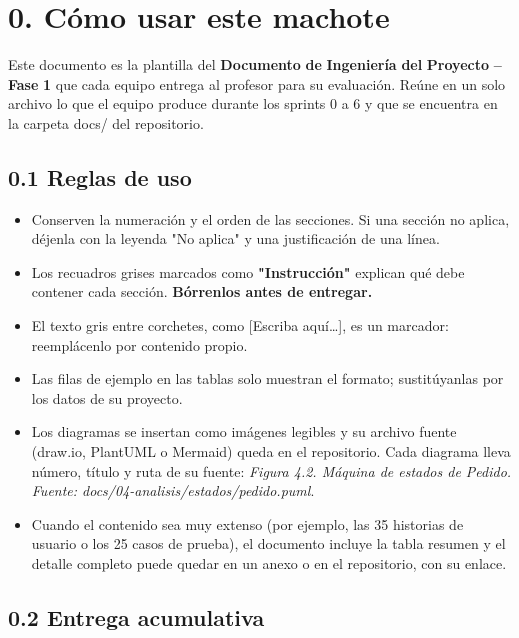 \section{0. Cómo usar este machote}\label{cuxf3mo-usar-este-machote}

Este documento es la plantilla del \textbf{Documento} \textbf{de}
\textbf{Ingeniería} \textbf{del} \textbf{Proyecto} \textbf{--}
\textbf{Fase} \textbf{1} que cada equipo entrega al profesor para su
evaluación. Reúne en un solo archivo lo que el equipo produce durante
los sprints 0 a 6 y que se encuentra en la carpeta docs/ del
repositorio.

\subsection{0.1 Reglas de uso}\label{reglas-de-uso}

\begin{itemize}
\item
  Conserven la numeración y el orden de las secciones. Si una sección no
  aplica, déjenla con la leyenda "No aplica" y una justificación de una
  línea.
\item
  Los recuadros grises marcados como \textbf{"Instrucción"} explican qué
  debe contener cada sección. \textbf{Bórrenlos antes de entregar.}
\item
  El texto gris entre corchetes, como {[}Escriba aquí\ldots{]}, es un
  marcador: reemplácenlo por contenido propio.
\item
  Las filas de ejemplo en las tablas solo muestran el formato;
  sustitúyanlas por los datos de su proyecto.
\item
  Los diagramas se insertan como imágenes legibles y su archivo fuente
  (draw.io, PlantUML o Mermaid) queda en el repositorio. Cada diagrama
  lleva número, título y ruta de su fuente: \emph{Figura 4.2. Máquina de
  estados de Pedido. Fuente: docs/04-analisis/estados/pedido.puml}.
\item
  Cuando el contenido sea muy extenso (por ejemplo, las 35 historias de
  usuario o los 25 casos de prueba), el documento incluye la tabla
  resumen y el detalle completo puede quedar en un anexo o en el
  repositorio, con su enlace.
\end{itemize}

\subsection{0.2 Entrega acumulativa}\label{entrega-acumulativa}

